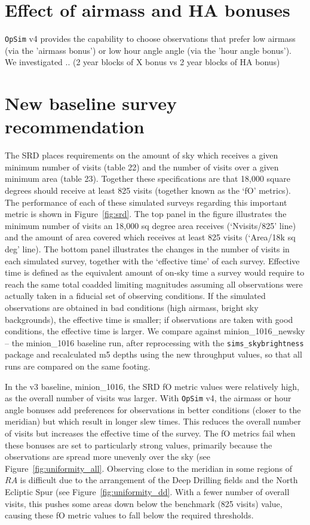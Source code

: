 \documentclass[DM,lsstdraft,authoryear,toc]{lsstdoc}
\newcommand{\opsim}{\texttt{OpSim}\xspace}
\newcommand{\simsky}{\texttt{sims\_skybrightness}\xspace}
\begin{document}
\section{Effect of airmass and HA bonuses} 

\opsim v4 provides the capability to choose observations that prefer low airmass (via the 'airmass bonus') or low hour angle angle (via the 'hour angle bonus'). We investigated ..
(2 year blocks of X bonus vs 2 year blocks of HA bonus)


\section{New baseline survey recommendation}

The SRD places requirements on the amount of sky which receives a given minimum number of visits (table 22) and the number of visits over a given minimum area (table 23). Together these specifications are that 18,000 square degrees should receive at least 825 visits (together known as the `fO' metrics). The performance of each of these simulated surveys regarding this important metric is shown in Figure~\ref{fig:srd}. The top panel in the figure illustrates the minimum number of visits an 18,000 sq degree area receives (`Nvisits/825' line) and the amount of area covered which receives at least 825 visits (`Area/18k sq deg' line).  The bottom panel illustrates the changes in the number of visits in each simulated survey, together with the `effective time' of each survey. Effective time is defined as the equivalent amount of on-sky time a survey would require to reach the same total coadded limiting magnitudes assuming all observations were actually taken in a fiducial set of observing conditions. If the simulated observations are obtained in bad conditions (high airmass, bright sky backgrounds), the effective time is smaller; if observations are taken with good conditions, the effective time is larger. We compare against minion\_1016\_newsky -- the minion\_1016 baseline run, after reprocessing with the \simsky package and recalculated m5 depths using the new throughput values, so that all runs are compared on the same footing.

In the v3 baseline, minion\_1016, the SRD fO metric values were relatively high, as the overall number of visits was larger. With \opsim v4, the airmass or hour angle bonuses add preferences for observations in better conditions (closer to the meridian) but which result in longer slew times. This reduces the overall number of visits but increases the effective time of the survey. The fO metrics fail when these bonuses are set to particularly strong values, primarily because the observations are spread more unevenly over the sky (see Figure~\ref{fig:uniformity_all}.  Observing close to the meridian in some regions of $RA$ is difficult due to the arrangement of the Deep Drilling fields and the North Ecliptic Spur (see Figure~\ref{fig:uniformity_dd}. With a fewer number of overall visits, this pushes some areas down below the benchmark (825 visits) value, causing these fO metric values to fall below the required thresholds. 
\end{document}
